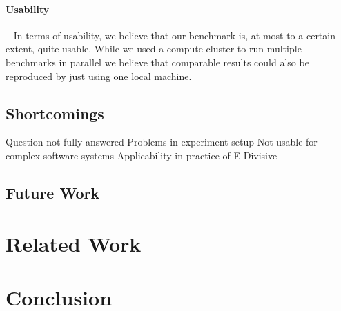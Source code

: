 \documentclass[	runningheads,
				a4paper]{llncs}
\begin{document}
\paragraph{Usability} -- In terms of usability, we believe that our benchmark is, at most to a certain extent, quite usable. While we used a compute cluster to run multiple benchmarks in parallel we believe that comparable results could also be reproduced by just using one local machine.

	\subsection{Shortcomings}
	\label{ssec:refl_shortcomings}
	Question not fully answered
	Problems in experiment setup
	Not usable for complex software systems
	Applicability in practice of E-Divisive

	\subsection{Future Work}

\section{Related Work}

\section{Conclusion}
	
	
	
	
	
\end{document}
